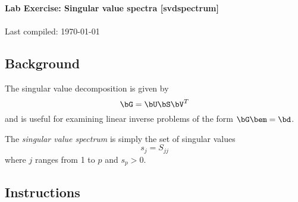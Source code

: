 \documentclass[11pt,titlepage,fleqn]{article}
\begin{document}

\begin{spacing}{1.2}
\centering
{\large \bf Lab Exercise: Singular value spectra [svdspectrum]} \\
\cltag\ \\
Last compiled: \today
\end{spacing}


\subsection*{Background}

The singular value decomposition is given by
%
\begin{equation*}
\bG = \bU\bS\bV^T
\end{equation*}
%
and is useful for examining linear inverse problems of the form $\bG\bem = \bd$.

The {\em singular value spectrum} is simply the set of singular values
%
\begin{equation*}
s_j = S_{jj}
\end{equation*}
%
where $j$ ranges from 1 to $p$ and $s_p > 0$.


\subsection*{Instructions}
\end{document}

